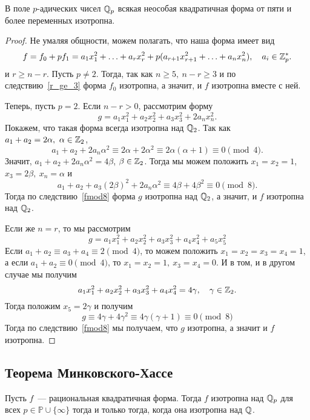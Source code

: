 	\begin{theorem} 
		В поле $p$-адических чисел $\mathbb{Q}_{p}$ всякая неособая квадратичная форма от пяти и более переменных изотропна. 
	\end{theorem}
	\begin{proof}
		Не умаляя общности, можем полагать, что наша форма имеет вид 
		\[
		f = f_0 + p f_1 = a_1 x_1^2 + \ldots + a_r x_r^2 + p(a_{r + 1}x_{r + 1}^2 + \ldots + a_{n} x_{n}^2), \quad a_i \in \mathbb{Z}_{p}^{*}.
	\]
	и $r \ge n - r$. Пусть $p \neq 2$. Тогда, так как $n \ge 5, \ n - r \ge 3$ и по следствию~\ref{r_ge_3} форма $f_0$ изотропна, а значит, и $f$ изотропна вместе с ней. 

	Теперь, пусть $p = 2$. Если $n - r > 0$, рассмотрим форму 
	\[
		g = a_1 x_1^2 + a_2 x_2^2 + a_3 x_3^2 + 2a_n x_n^2.
	\]
	Покажем, что такая форма всегда изотропна над $\mathbb{Q}_2$. Так как $a_1 + a_2 = 2\alpha, \ \alpha \in \mathbb{Z}_{2}$,
	\[
		a_1 + a_2 + 2a_n \alpha^2 \equiv 2\alpha + 2\alpha^2 \equiv 2\alpha(\alpha + 1) \equiv 0 \pmod{4}. 
	\]
	Значит, $a_1 + a_2 + 2a_n \alpha^2 = 4\beta$, $\beta \in \mathbb{Z}_{2}$. Тогда мы можем положить $x_1 = x_2 = 1$, $x_3 = 2\beta, \ x_n = \alpha$ и 
	\[
		a_1 + a_2 + a_3(2\beta)^2 + 2a_n\alpha^2 \equiv 4\beta + 4\beta^2 \equiv 0 \pmod{8}.
	\]
	Тогда по следствию~\ref{fmod8} форма $g$ изотропна над $\mathbb{Q}_2$, а значит, и $f$ изотропна над $\mathbb{Q}_2$. 

	Если же $n = r$, то мы рассмотрим 
	\[
		g = a_1 x_1^2 + a_2 x_2^2 + a_3 x_3^2 + a_4 x_4^2 + a_5 x_5^2
	\]
	Если $a_1 + a_2 \equiv a_3 + a_4 \equiv 2 \pmod{4}$, то можем положить $x_1 = x_2 = x_3 = x_4 = 1$, а если $a_1 + a_2 \equiv 0 \pmod{4}$, то $x_1 = x_2 = 1, \ x_3 = x_4 = 0$. И в том, и в другом случае мы получим 
	\[
		a_1 x_1^2 + a_2 x_2^2 + a_3 x_3^2 + a_4 x_4^2 = 4\gamma, \quad \gamma \in \mathbb{Z}_{2}.
	\]
	Тогда положим $x_5 = 2\gamma$ и получим 
	\[
		g \equiv 4 \gamma + 4\gamma^2 \equiv 4\gamma(\gamma + 1) \equiv 0 \pmod{8}
	\]
	Тогда по следствию~\ref{fmod8} мы получаем, что $g$ изотропна, а значит и $f$ изотропна. 

	\end{proof}



	\subsection{Теорема Минковского-Хассе}

	\begin{theorem}\label{MinkHasse} 
		Пусть $f$~--- рациональная квадратичная форма. Тогда $f$ изотропна над $\mathbb{Q}_{p}$ для всех  $p \in \mathbb{P} \cup \{ \infty \}$ тогда и только тогда, когда она изотропна над $\mathbb{Q}$.
	\end{theorem}

